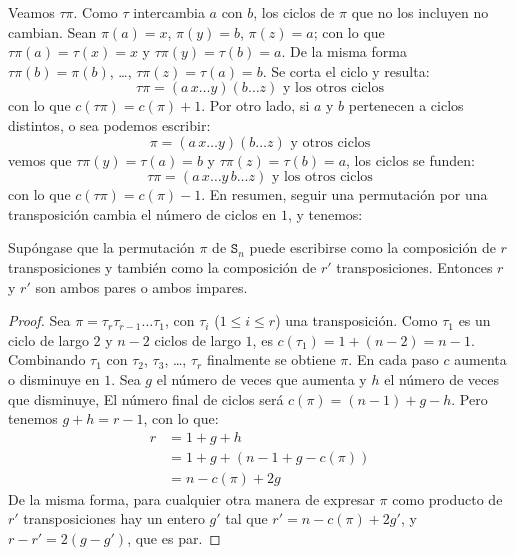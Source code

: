   Veamos \(\tau \pi\).
  Como \(\tau\) intercambia \(a\) con \(b\),
  los ciclos de \(\pi\) que no los incluyen no cambian.
  Sean \(\pi(a) = x\), \(\pi(y) = b\), \(\pi(z) = a\);
  con lo que
  \(\tau \pi(a) = \tau(x) = x\) y \(\tau \pi(y) = \tau(b) = a\).
  De la misma forma \(\tau \pi(b) = \pi(b)\), \ldots,
		\(\tau \pi(z) = \tau(a) = b\).
  Se corta el ciclo y resulta:
  \begin{equation*}
    \tau \pi
      = (a \, x \dotso y) (b \dotso z) \text{\ y los otros ciclos}
  \end{equation*}
  con lo que \(c(\tau \pi) = c(\pi) + 1\).
  Por otro lado,
  si \(a\) y \(b\) pertenecen a ciclos distintos,
  o sea podemos escribir:
  \begin{equation*}
    \pi
      = (a \, x \dotso y) (b \dotso z) \text{\ y otros ciclos}
  \end{equation*}
  vemos que
    \(\tau \pi(y) = \tau(a) = b\) y \(\tau \pi(z) = \tau(b) = a\),
  los ciclos se funden:
  \begin{equation*}
    \tau \pi
      = (a \, x \dotso y \, b \dotso z) \text{\ y los otros ciclos}
  \end{equation*}
  con lo que \(c(\tau \pi) = c(\pi) - 1\).
  En resumen,
  seguir una permutación por una transposición
  cambia el número de ciclos en \(1\),
  y tenemos:
  \begin{theorem}
    \label{theo:permutations-transposiciones}
    Supóngase que la permutación \(\pi\) de \(\mathtt{S}_n\)
    puede escribirse como la composición de \(r\) transposiciones
    y también como la composición de \(r'\) transposiciones.
    Entonces \(r\) y \(r'\) son ambos pares o ambos impares.
  \end{theorem}
  \begin{proof}
    Sea \(\pi = \tau_r \tau_{r - 1} \dotso \tau_1\),
    con \(\tau_i\) (\(1 \le i \le r\)) una transposición.
    Como \(\tau_1\) es un ciclo de largo \(2\)
    y \(n - 2\) ciclos de largo \(1\),
    es \(c(\tau_1) = 1 + (n - 2) = n - 1\).
    Combinando \(\tau_1\)
    con \(\tau_2\), \(\tau_3\), \ldots, \(\tau_r\)
    finalmente se obtiene \(\pi\).
    En cada paso \(c\) aumenta o disminuye en \(1\).
    Sea \(g\) el número de veces que aumenta
    y \(h\) el número de veces que disminuye,
    El número final de ciclos será \(c(\pi) = (n - 1) + g - h\).
    Pero tenemos \(g + h = r - 1\),
    con lo que:
    \begin{align*}
      r &= 1 + g + h \\
	&= 1 + g + (n - 1 + g - c(\pi)) \\
	&= n - c(\pi) + 2 g
    \end{align*}
    De la misma forma,
    para cualquier otra manera de expresar \(\pi\)
    como producto de \(r'\) transposiciones
    hay un entero \(g'\) tal que \(r' = n - c(\pi) + 2 g'\),
    y \(r - r' = 2 (g - g')\),
    que es par.
  \end{proof}

